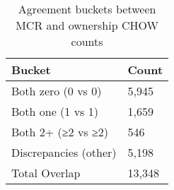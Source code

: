\documentclass{article}
\begin{document}
\begin{table}
\centering
\caption{Agreement buckets between MCR and ownership CHOW counts}
\label{tab:chow_agreement_summary}
\begin{tabular}{ll}
\toprule
Bucket & Count \\
\midrule
Both zero (0 vs 0) & 5,945 \\
Both one (1 vs 1) & 1,659 \\
Both 2+ (≥2 vs ≥2) & 546 \\
Discrepancies (other) & 5,198 \\
Total Overlap & 13,348 \\
\bottomrule
\end{tabular}

\end{table}
\end{document}
